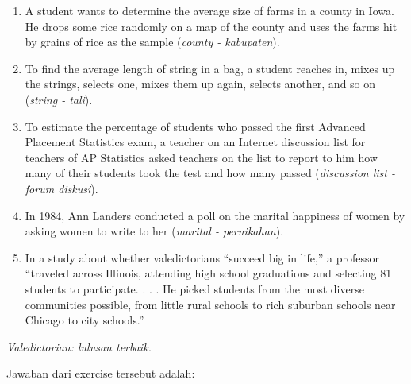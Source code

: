 \documentclass[
  letterpaper,
  DIV=11,
  numbers=noendperiod]{scrreprt}
\providecommand{\tightlist}{%
  \setlength{\itemsep}{0pt}\setlength{\parskip}{0pt}}\usepackage{longtable,booktabs,array}
\begin{document}
\begin{enumerate}
\def\labelenumi{\arabic{enumi}.}
\tightlist
\item
  A student wants to determine the average size of farms in a county in
  Iowa. He drops some rice randomly on a map of the county and uses the
  farms hit by grains of rice as the sample (\emph{county - kabupaten}).
\item
  To find the average length of string in a bag, a student reaches in,
  mixes up the strings, selects one, mixes them up again, selects
  another, and so on (\emph{string - tali}).
\item
  To estimate the percentage of students who passed the first Advanced
  Placement Statistics exam, a teacher on an Internet discussion list
  for teachers of AP Statistics asked teachers on the list to report to
  him how many of their students took the test and how many passed
  (\emph{discussion list - forum diskusi}).
\item
  In 1984, Ann Landers conducted a poll on the marital happiness of
  women by asking women to write to her (\emph{marital - pernikahan}).
\item
  In a study about whether valedictorians ``succeed big in life,'' a
  professor ``traveled across Illinois, attending high school
  graduations and selecting 81 students to participate. . . . He picked
  students from the most diverse communities possible, from little rural
  schools to rich suburban schools near Chicago to city schools.''
\end{enumerate}

\emph{Valedictorian: lulusan terbaik.}

Jawaban dari exercise tersebut adalah:
\end{document}
